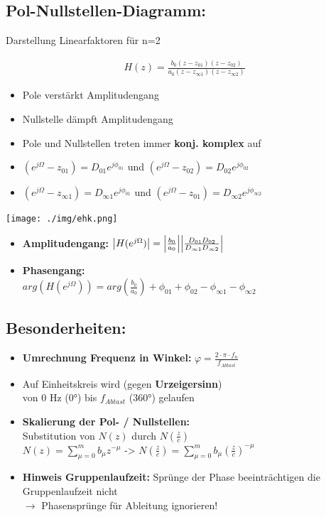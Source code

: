 \documentclass[10pt,a4paper]{article}
\begin{document}
\subsection{Pol-Nullstellen-Diagramm:}
Darstellung Linearfaktoren für n=2
  \begin{mdframed}[style=exercise]
    \begin{align}
        H(z)=\frac{b_0(z-z_{01})(z-z_{02})}{a_0(z-z_{\infty 1})(z-z_{\infty 2})}
    \end{align}
  \end{mdframed}

\begin{itemize}
    \item Pole verstärkt Amplitudengang
    \item Nullstelle dämpft Amplitudengang
    \item Pole und Nullstellen treten immer \textbf{konj. komplex} auf
\end{itemize}
\begin{itemize}
    \item $(e^{j\Omega}-z_{01}) = D_{01}e^{j\phi_{01}}$ und $(e^{j\Omega}-z_{02}) = D_{02}e^{j\phi_{02}}$
    \item $(e^{j\Omega}-z_{\infty 1}) = D_{\infty 1}e^{j\phi_{01}}$ und $(e^{j\Omega}-z_{01}) = D_{\infty 2}e^{j\phi_{\infty 2}}$
\end{itemize}
  \begin{center}
      \texttt{[image: ./img/ehk.png]}
  \end{center}
\begin{itemize}
    \item \textbf{Amplitudengang: } $\abs{H(e^{j\Omega})}=\abs{\frac{b_0}{a_0}} \abs{ \frac{D_{01}D_{02}}{D_{\infty 1}D_{\infty 2}}}$
    \item \textbf{Phasengang: }\\
    $arg({H(e^{j\Omega})})=arg(\frac{b_0}{a_0}) +\phi_{01} +\phi_{02}-\phi_{\infty 1}-\phi_{\infty 2}$
\end{itemize}

\subsection{Besonderheiten: }
\begin{itemize}
    \item \textbf{Umrechnung Frequenz in Winkel:} $\varphi = \frac{2\cdot\pi\cdot f_{n}}{f_{Abtast}}$
    \item Auf Einheitskreis wird (gegen \textbf{Urzeigersinn})\\
    von 0 Hz (0°) bis $f_{Abtast}$ (360°) gelaufen
    \item \textbf{Skalierung der Pol- / Nullstellen: } \\
    Substitution von $N(z)$ durch $N(\frac{z}{c})$\\
    $N(z)=\sum_{\mu=0}^{m} b_\mu z^{-\mu}$ -> $N(\frac{z}{c})=\sum_{\mu=0}^{m} b_\mu (\frac{z}{c})^{-\mu}$
    \item\textbf{Hinweis Gruppenlaufzeit: } Sprünge der Phase beeinträchtigen die Gruppenlaufzeit nicht\\
    $\rightarrow$ Phasensprünge für Ableitung ignorieren!
\end{itemize}
 
\end{document}
